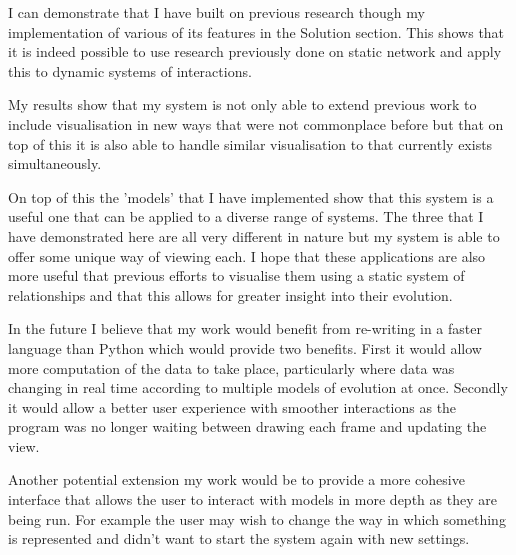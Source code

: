 \documentclass[12pt,a4paper]{article}
\begin{document}
I can demonstrate that I have built on previous research though my implementation of various of its features in the Solution section. This shows that it is indeed possible to use research previously done on static network and apply this to dynamic systems of interactions.

My results show that my system is not only able to extend previous work to include visualisation in new ways that were not commonplace before but that on top of this it is also able to handle similar visualisation to that currently exists simultaneously.

On top of this the 'models' that I have implemented show that this system is a useful one that can be applied to a diverse range of systems. The three that I have demonstrated here are all very different in nature but my system is able to offer some unique way of viewing each. I hope that these applications are also more useful that previous efforts to visualise them using a static system of relationships and that this allows for greater insight into their evolution.

In the future I believe that my work would benefit from re-writing in a faster language than Python which would provide two benefits. First it would allow more computation of the data to take place, particularly where data was changing in real time according to multiple models of evolution at once. Secondly it would allow a better user experience with smoother interactions as the program was no longer waiting between drawing each frame and updating the view.

Another potential extension my work would be to provide a more cohesive interface that allows the user to interact with models in more depth as they are being run. For example the user may wish to change the way in which something is represented and didn't want to start the system again with new settings.


\end{document}
